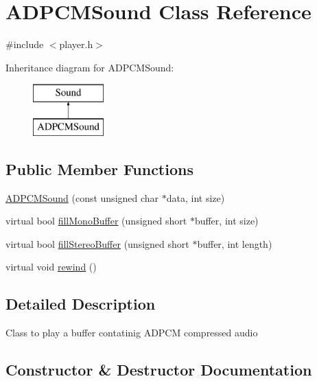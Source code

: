 \hypertarget{class_a_d_p_c_m_sound}{}\section{A\+D\+P\+C\+M\+Sound Class Reference}
\label{class_a_d_p_c_m_sound}


{\ttfamily \#include $<$player.\+h$>$}

Inheritance diagram for A\+D\+P\+C\+M\+Sound\+:\begin{figure}[H]
\begin{center}
\leavevmode
\includegraphics[height=2.000000cm]{class_a_d_p_c_m_sound}
\end{center}
\end{figure}
\subsection*{Public Member Functions}
\begin{DoxyCompactItemize}
\item 
\hyperlink{class_a_d_p_c_m_sound_a4213786af4c9c618d58955f8e83bfdca}{A\+D\+P\+C\+M\+Sound} (const unsigned char $\ast$data, int size)
\item 
virtual bool \hyperlink{class_a_d_p_c_m_sound_aa4bae7530240f47b76abef5dee718649}{fill\+Mono\+Buffer} (unsigned short $\ast$buffer, int size)
\item 
virtual bool \hyperlink{class_a_d_p_c_m_sound_a04e36f00fa43f9da21bc4bd97a2ddf44}{fill\+Stereo\+Buffer} (unsigned short $\ast$buffer, int length)
\item 
virtual void \hyperlink{class_a_d_p_c_m_sound_ac1c8d4b362dd7803087f82f3b26f6957}{rewind} ()
\end{DoxyCompactItemize}


\subsection{Detailed Description}
Class to play a buffer contatinig A\+D\+P\+CM compressed audio 

\subsection{Constructor \& Destructor Documentation}
\mbox{\label{class_a_d_p_c_m_sound_a4213786af4c9c618d58955f8e83bfdca}} 

